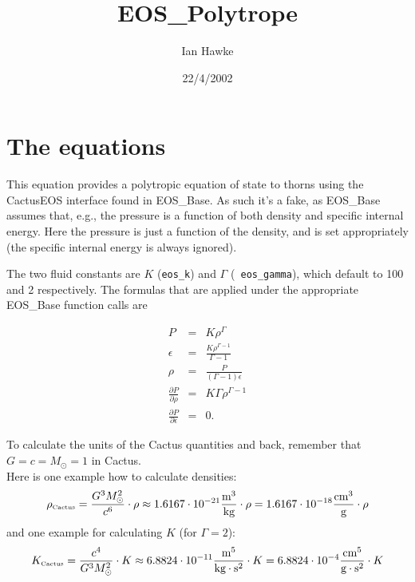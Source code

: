 \documentclass{article}
\begin{document}
\title{EOS\_Polytrope}
\author{Ian Hawke}
\date{22/4/2002}
\maketitle



\section{The equations}
\label{sec:eqn}

This equation provides a polytropic equation of state to thorns using
the CactusEOS interface found in EOS\_Base. As such it's a fake, as
EOS\_Base assumes that, e.g., the pressure is a function of both
density and specific internal energy. Here the pressure is just a
function of the density, and is set appropriately (the specific
internal energy is always ignored).

The two fluid constants are $K$ ({\tt eos\_k}) and $\Gamma$ ({\tt
  eos\_gamma}), which default to 100 and 2 respectively. The formulas
that are applied under the appropriate EOS\_Base function calls are

\begin{eqnarray}
  \label{eq:eosformulas}
  P & = & K \rho^{\Gamma} \\
  \epsilon & = & \frac{K \rho^{\Gamma-1}}{\Gamma - 1} \\
  \rho & = & \frac{P}{(\Gamma - 1) \epsilon} \\
  \frac{\partial P}{\partial \rho} & = & K \Gamma \rho^{\Gamma-1} \\
  \frac{\partial P}{\partial \epsilon} & = & 0.
\end{eqnarray}

To calculate the units of the Cactus quantities and back, remember that
$G=c=M_{\odot}=1$ in Cactus.\\
Here is one example how to calculate densities:
\begin{equation}
 \rho_{\mbox{\tiny Cactus}}=\frac{G^3M_{\odot}^2}{c^6}\cdot \rho
 \approx1.6167\cdot10^{-21}\frac{\mbox{m}^3}{\mbox{kg}}\cdot\rho=
        1.6167\cdot10^{-18}\frac{\mbox{cm}^3}{\mbox{g}}\cdot\rho
\end{equation}
and one example for calculating $K$ (for $\Gamma=2$):
\begin{equation}
 K_{\mbox{\tiny Cactus}}=\frac{c^4}{G^3M_{\odot}^2}\cdot K
 \approx6.8824\cdot10^{-11}\frac{\mbox{m}^5}{\mbox{kg}\cdot\mbox{s}^2}\cdot K=
        6.8824\cdot10^{-4}\frac{\mbox{cm}^5}{\mbox{g}\cdot\mbox{s}^2}\cdot K
\end{equation}

\end{document}
